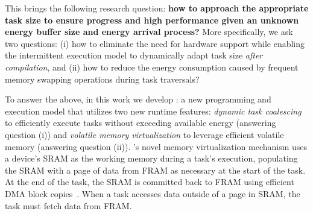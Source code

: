 This brings the following research question: {\bf how to approach the appropriate task size to ensure progress and high performance given an unknown energy buffer size and energy arrival process?} More specifically, we ask two questions: (i) how to eliminate the need for hardware support while enabling the intermittent execution model to dynamically adapt task size {\em after compilation}, and (ii) how to reduce the energy consumption caused by frequent memory swapping operations during task traversals?

To answer the above, in this work we develop {\bf \sys}: a new programming and execution model that utilizes two new runtime features: {\em dynamic task coalescing} to efficiently execute tasks without exceeding available energy (answering question (i)) and  {\em volatile memory virtualization} to leverage efficient volatile memory (answering question (ii)). \sys's novel memory virtualization mechanism uses a device's SRAM as the working memory during a task's execution, populating the SRAM with a page of data from FRAM as necessary at the start of the task. At the end of the task, the SRAM is committed back to FRAM using efficient DMA block copies~\cite{kistler_micro_2006}. When a task accesses data outside of a page in SRAM, the task must fetch data from FRAM.
%

